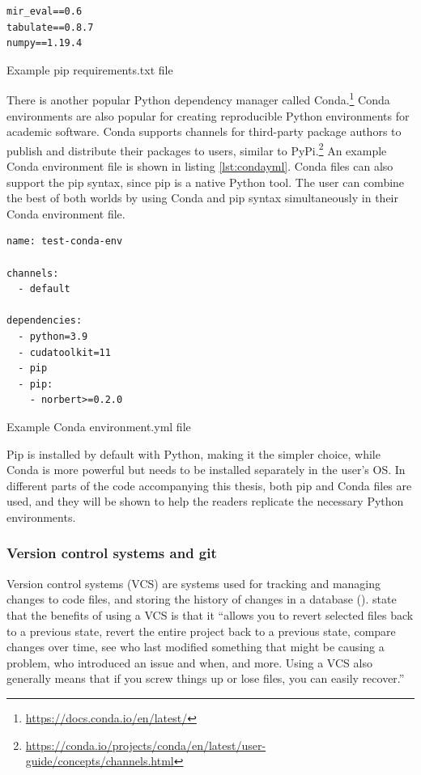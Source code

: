 \documentclass[report.tex]{subfiles}
\begin{document}
\begin{listing}[ht]
\centering
\begin{BVerbatim}
mir_eval==0.6
tabulate==0.8.7
numpy==1.19.4
\end{BVerbatim}
	\caption{Example pip requirements.txt file}
	\label{lst:reqtxt}
\end{listing}

There is another popular Python dependency manager called Conda.\footnote{\url{https://docs.conda.io/en/latest/}} Conda environments are also popular for creating reproducible Python environments for academic software. Conda supports channels for third-party package authors to publish and distribute their packages to users, similar to PyPi.\footnote{\url{https://conda.io/projects/conda/en/latest/user-guide/concepts/channels.html}} An example Conda environment file is shown in listing \ref{lst:condayml}. Conda files can also support the pip syntax, since pip is a native Python tool. The user can combine the best of both worlds by using Conda and pip syntax simultaneously in their Conda environment file.

\begin{listing}[ht]
\centering
\begin{BVerbatim}
name: test-conda-env

channels:
  - default

dependencies:
  - python=3.9
  - cudatoolkit=11
  - pip
  - pip:
    - norbert>=0.2.0
\end{BVerbatim}
	\caption{Example Conda environment.yml file}
	\label{lst:condayml}
\end{listing}

Pip is installed by default with Python, making it the simpler choice, while Conda is more powerful but needs to be installed separately in the user's OS. In different parts of the code accompanying this thesis, both pip and Conda files are used, and they will be shown to help the readers replicate the necessary Python environments.

\subsubsection{Version control systems and git}

Version control systems (VCS) are systems used for tracking and managing changes to code files, and storing the history of changes in a database (\cite{gitbook}). \textcite{gitbook} state that the benefits of using a VCS is that it ``allows you to revert selected files back to a previous state, revert the entire project back to a previous state, compare changes over time, see who last modified something that might be causing a problem, who introduced an issue and when, and more. Using a VCS also generally means that if you screw things up or lose files, you can easily recover.''
\end{document}
